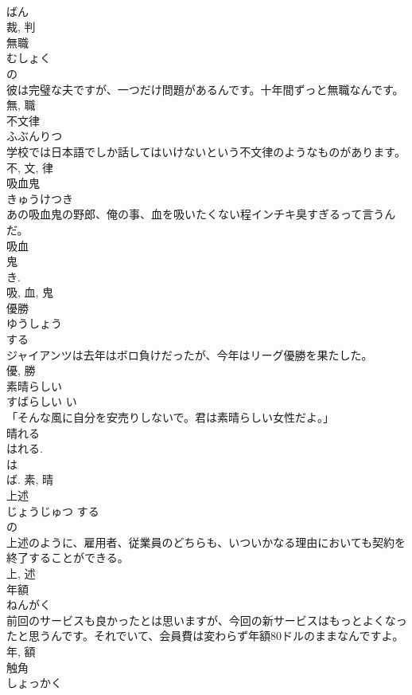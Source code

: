 \documentclass[8pt]{extreport}
\begin{document}
\begin{CJK}{UTF8}{min}
\\	ばん 
\\	裁, 判	
\\	無職	
\\	むしょく	
\\	の 
\\	彼は完璧な夫ですが、一つだけ問題があるんです。十年間ずっと無職なんです。	
\\	無, 職	
\\	不文律	
\\	ふぶんりつ	
\\	学校では日本語でしか話してはいけないという不文律のようなものがあります。	
\\	不, 文, 律	
\\	吸血鬼	
\\	きゅうけつき	
\\	あの吸血鬼の野郎、俺の事、血を吸いたくない程インチキ臭すぎるって言うんだ。	
\\	吸血 
\\	鬼 
\\	き. 
\\	吸, 血, 鬼	
\\	優勝	
\\	ゆうしょう	
\\	する 
\\	ジャイアンツは去年はボロ負けだったが、今年はリーグ優勝を果たした。	
\\	優, 勝	
\\	素晴らしい	
\\	すばらしい	い 
\\	「そんな風に自分を安売りしないで。君は素晴らしい女性だよ。」	
\\	晴れる 
\\	はれる. 
\\	は 
\\	ば.	素, 晴	
\\	上述	
\\	じょうじゅつ	する 
\\	の 
\\	上述のように、雇用者、従業員のどちらも、いついかなる理由においても契約を終了することができる。	
\\	上, 述	
\\	年額	
\\	ねんがく	
\\	前回のサービスも良かったとは思いますが、今回の新サービスはもっとよくなったと思うんです。それでいて、会員費は変わらず年額80ドルのままなんですよ。	
\\	年, 額	
\\	触角	
\\	しょっかく	

\end{CJK}
\end{document}
